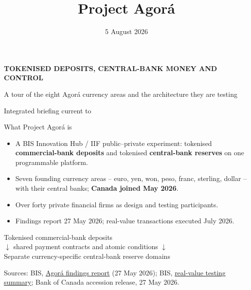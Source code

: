 \documentclass[aspectratio=169,12pt]{beamer}
\title{Project Agor\'a}
\date{5 August 2026}
\newcommand{\rust}[1]{\textcolor{Rust}{\textbf{#1}}}
\newcommand{\source}[1]{\vfill\par\fontsize{5.4}{6.5}\selectfont\color{Quiet}Sources: #1}
\newcommand{\tightitems}{\setlength{\itemsep}{0.42em}\setlength{\parskip}{0pt}}
\begin{document}
\begingroup
{}
\begin{frame}[plain]
  \vspace{0.62cm}
  {\color{Gold}\fontsize{10}{12}\selectfont\bfseries TOKENISED DEPOSITS, CENTRAL-BANK MONEY AND CONTROL\par}
  \vspace{0.28cm}
  {\color{White}\inserttitle\par}
  \vfill
  {\color{White}\fontsize{9.6}{11.5}\selectfont A tour of the eight Agor\'a currency areas and the architecture they are testing\par}
  \vspace{0.12cm}
  {\color{Mist}\fontsize{7.8}{9.5}\selectfont Integrated briefing current to \insertdate}
\end{frame}
\endgroup

\begin{frame}{What Project Agor\'a is}
  \begin{itemize}\tightitems
    \item A BIS Innovation Hub / IIF public--private experiment: tokenised \rust{commercial-bank deposits} and tokenised \rust{central-bank reserves} on one programmable platform.
    \item Seven founding currency areas -- euro, yen, won, peso, franc, sterling, dollar -- with their central banks; \rust{Canada joined May 2026}.
    \item Over forty private financial firms as design and testing participants.
    \item Findings report 27 May 2026; real-value transactions executed July 2026.
  \end{itemize}
  \vspace{0.20cm}
  \begin{center}
    \fontsize{12.5}{15}\selectfont
    Tokenised commercial-bank deposits \\
    \vspace{0.14cm}
    $\downarrow$ \quad shared payment contracts and atomic conditions \quad $\downarrow$ \\
    \vspace{0.14cm}
    Separate currency-specific central-bank reserve domains
  \end{center}
  \source{BIS, \href{https://www.bis.org/publ/othp110.htm}{Agor\'a findings report} (27 May 2026); BIS, \href{https://www.bis.org/about/bisih/topics/fmis/agora/rvt.htm}{real-value testing summary}; Bank of Canada accession release, 27 May 2026.}
\end{frame}
\end{document}
